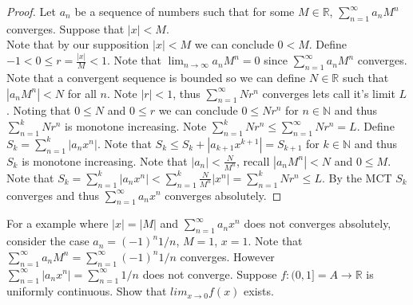 \documentclass[12pt]{article}
\makeatletter
\theoremstyle{homework}
\newenvironment{exercise}[1]
{\def\@currentlabel{#1}\exercisecore}
{\endexercisecore}
\makeatother
\begin{document}
\begin{proof}
Let $a_n$ be a sequence of numbers such that for some $M \in \mathbb{R}$, $\sum^\infty_{n=1} a_nM^n$ converges. Suppose
that $|x| < M$.\\
Note that by our supposition $|x| < M$ we can conclude $0< M$.  Define $-1<0\leq r=\frac{|x|}{M}<1$.  Note that $\lim_{n\rightarrow \infty} a_nM^n=0$ since $\sum^\infty_{n=1} a_nM^n$ converges.  Note that a convergent sequence is bounded so we can define $N\in\mathbb{R}$ such that $|a_nM^n|<N$ for all $n$.  Note $|r|<1$, thus $\sum_{n=1}^\infty N r^n$ converges lets call it's limit $L$.  Noting that $0\leq N$ and $0\leq r$ we can conclude $0\leq N r^n$ for $n\in\mathbb{N}$ and thus $\sum_{n=1}^k N r^n$ is monotone increasing.  Note $\sum_{n=1}^k N r^n\leq \sum_{n=1}^\infty N r^n=L$.  Define $S_k=\sum^k_{n=1} |a_nx^n|$.  Note that $S_k\leq S_k+|a_{k+1}x^{k+1}|=S_{k+1}$ for $k\in\mathbb{N}$ and thus $S_k$ is monotone increasing.  Note that $|a_n|<\frac{N}{M^n}$, recall $|a_nM^n|<N$ and $0\leq M$.  Note that $S_k=\sum^k_{n=1} |a_nx^n|<\sum^k_{n=1} \frac{N}{M^n}|x^n|=\sum^k_{n=1} N r^n\leq L$.  By the MCT $S_k$ converges and thus $\sum^\infty_{n=1} a_nx^n$ converges absolutely.

\end{proof}
For a example where $|x| = |M|$ and $\sum^\infty_{n=1} a_nx^n$ does not converges absolutely, consider the case $a_n=(-1)^n1/n$, $M=1$, $x=1$.  Note that $\sum^\infty_{n=1} a_nM^n=\sum^\infty_{n=1} (-1)^n1/n$ converges.  However $\sum^\infty_{n=1} |a_nx^n|=\sum^\infty_{n=1} 1/n$ does not converge.
\begin{exercise} 3
Suppose $f : (0,1]=A \rightarrow\mathbb{R}$ is uniformly continuous. Show that $lim_{x\rightarrow 0} f (x)$ exists.
\end{exercise}
\end{document}
